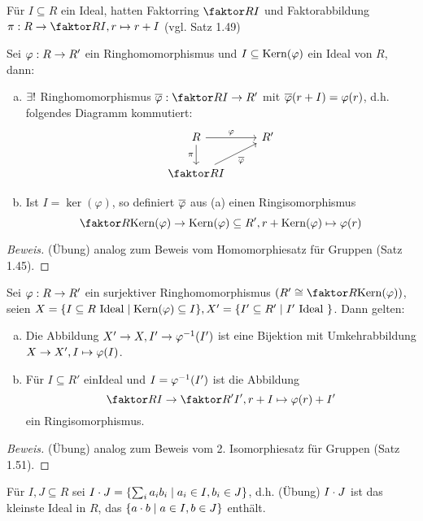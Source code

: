 \documentclass[a4paper]{report}
\begin{document}
\begin{whg*}
Für $I \subseteq R$ ein Ideal, hatten Faktorring $\fak RI$ und Faktorabbildung $\pi : R \to \fak RI, r \mps r+I$ (vgl. Satz 1.49)
\end{whg*}

\begin{satz}
  Sei $\varphi : R \to R'$ ein Ringhomomorphismus und $I \subseteq \operatorname{Kern}(\varphi)$ ein Ideal von $R$, dann:
  \begin{enumerate}[(a)]
          \item $\exists !$ Ringhomomorphismus $\bar \ph : \fak RI \to R'$ mit $\overline {\varphi} (r+I) = \varphi(r)$, d.h. folgendes Diagramm kommutiert:
\[\begin{tikzcd}
R \arrow[d, "\pi"'] \arrow[r, "\ph"] & R' \\
\fak RI \arrow[ru, "\bar \ph"']       &
\end{tikzcd}\]
          \item Ist $I = \ker(\varphi)$, so definiert $\overline {\varphi}$ aus (a) einen Ringisomorphismus \[\fak R{\ker(\ph)} \to \bil(\ph) \subseteq R', r+\ker(\varphi) \mps \ph(r)\]
  \end{enumerate}
  \begin{proof}[Beweis] (Übung) analog zum Beweis vom Homomorphiesatz für Gruppen (Satz 1.45).
  \end{proof}
\end{satz}
\begin{satz}
  Sei $\varphi : R \to R'$ ein surjektiver Ringhomomorphismus $\l(R' \cong \fak R{\ker(\ph)}\r)$, seien $X = \{I \subseteq R \text{ Ideal} \mid  \operatorname{Kern}(\varphi) \subseteq I\}, X' = \{I' \subseteq R' \mid I' \text{ Ideal }\}$. Dann gelten:
  \begin{enumerate}[(a)]
    \item Die Abbildung $X' \to X, I' \to \varphi^{-1}(I')$ ist eine Bijektion mit Umkehrabbildung $X \to X', I \mapsto \varphi(I)$.
    \item Für $I \subseteq R'$ einIdeal und $I = \varphi^{-1}(I')$ ist die Abbildung
          \[\fak RI \to \fak{R'}{I'}, r+I \mps \ph(r) + I'\]
          ein Ringisomorphismus.
  \end{enumerate}
  \begin{proof}[Beweis]
  (Übung) analog zum Beweis vom 2. Isomorphiesatz für Gruppen (Satz 1.51).
  \end{proof}
\end{satz}

\begin{nota*}
Für $I, J \subseteq R$ sei $I \cdot J = \{\sum_{i}a_{i}b_{i} \mid a_{i} \in I, b_{i} \in J\}$, d.h. (Übung) $I \cdot J$ ist das kleinste Ideal in $R$, das $\{a \cdot b \mid a \in I, b \in J\}$ enthält.
\end{nota*}
\end{document}
